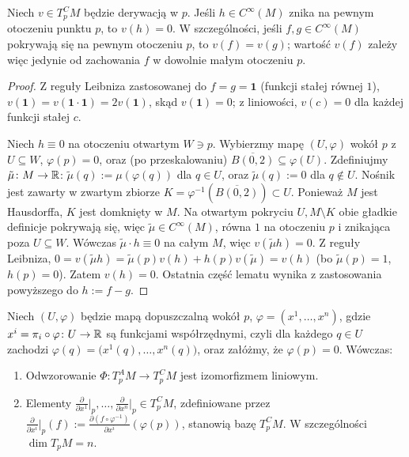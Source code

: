 \begin{lemat}\label{lem:lokalnosc}
Niech $v\in T_p^CM$ będzie derywacją w $p$. Jeśli $h\in C^\infty(M)$ znika na pewnym
otoczeniu punktu $p$, to $v(h)=0$. W szczególności, jeśli $f,g\in C^\infty(M)$ pokrywają
się na pewnym otoczeniu $p$, to $v(f)=v(g)$; wartość $v(f)$ zależy więc jedynie od
zachowania $f$ w dowolnie małym otoczeniu $p$.
\end{lemat}
\begin{proof}
Z reguły Leibniza zastosowanej do $f=g=\mathbf1$ (funkcji stałej równej $1$),
$v(\mathbf1)=v(\mathbf1\cdot\mathbf1)=2v(\mathbf1)$, skąd $v(\mathbf1)=0$; z liniowości,
$v(c)=0$ dla każdej funkcji stałej $c$.

Niech $h\equiv0$ na otoczeniu otwartym $W\ni p$. Wybierzmy mapę $(U,\varphi)$ wokół $p$ z
$U\subseteq W$, $\varphi(p)=0$, oraz (po przeskalowaniu)
$\overline{B(0,2)}\subseteq\varphi(U)$.
Zdefiniujmy $\tilde\mu\colon M\to\mathbb{R}$: $\tilde\mu(q):=\mu(\varphi(q))$ dla $q\in U$, oraz
$\tilde\mu(q):=0$ dla $q\notin U$. Nośnik jest zawarty w zwartym
zbiorze $K=\varphi^{-1}(\overline{B(0,2)})\subset U$.
Ponieważ $M$ jest Hausdorffa, $K$ jest domknięty w $M$.
Na otwartym pokryciu $U, M\setminus K$ obie gładkie definicje
pokrywają się, więc $\tilde\mu\in C^\infty(M)$, równa $1$ na otoczeniu $p$ i znikająca poza
$U\subseteq W$. Wówczas $\tilde\mu\cdot h\equiv0$ na całym $M$, więc $v(\tilde\mu h)=0$.
Z reguły Leibniza, $0=v(\tilde\mu h)=\tilde\mu(p)v(h)+h(p)v(\tilde\mu)=v(h)$ (bo
$\tilde\mu(p)=1$, $h(p)=0$). Zatem $v(h)=0$. Ostatnia część lematu wynika z zastosowania
powyższego do $h:=f-g$.
\end{proof}

\begin{twierdzenie}\label{tw:baza-styczna}
Niech $(U,\varphi)$ będzie mapą dopuszczalną wokół $p$,
$\varphi=(x^1,\dots,x^n)$,
gdzie $x^i=\pi_i\circ\varphi\colon U\to\mathbb{R}$ są funkcjami współrzędnymi,
czyli dla każdego $q\in U$ zachodzi
$\varphi(q)=\bigl(x^1(q),\dots,x^n(q)\bigr)$,
oraz załóżmy, że $\varphi(p)=0$. Wówczas:
\begin{enumerate}[label=(\alph*)]
\item Odwzorowanie $\Phi\colon T_p^AM\to T_p^CM$ jest izomorfizmem liniowym.
\item Elementy $\frac{\partial}{\partial x^1}\big|_p,\dots,\frac{\partial}{\partial x^n}
\big|_p\in T_p^CM$, zdefiniowane przez $\frac{\partial}{\partial x^i}\big|_p(f):=
\frac{\partial(f\circ\varphi^{-1})}{\partial x^i}(\varphi(p))$, stanowią bazę $T_p^CM$.
W szczególności $\dim T_pM=n$.
\end{enumerate}
\end{twierdzenie}

